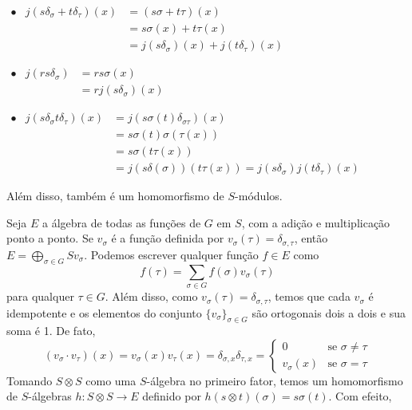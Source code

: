     \vspace{0.3 cm}
    
     $\begin{array}{rrl}
        \bullet &  j(s\delta_\sigma+t\delta_\tau)(x) &= (s\sigma+t\tau)(x) \\
       & &= s\sigma(x)+t\tau(x) \\
        & &= j(s\delta_\sigma)(x)+j(t\delta_\tau)(x)
    \end{array}$
    
     \vspace{0.3 cm}
     
     $\begin{array}{rrl}
       \bullet &  j(rs\delta_\sigma) &= rs\sigma(x) \\
        & &= rj(s\delta_\sigma)(x)
    \end{array}$
    
     \vspace{0.3 cm} 
     
     $\begin{array}{rrl}
        \bullet &  j(s\delta_\sigma t\delta_\tau)(x) &= j(s\sigma(t)\delta_{\sigma\tau})(x) \\
        & &= s\sigma(t)\sigma(\tau(x)) \\
        & &= s\sigma(t\tau(x)) \\
        & &= j(s\delta(\sigma))(t\tau(x))=j(s\delta_\sigma)j(t\delta_\tau)(x)
     \end{array}$
  \vspace{0.3 cm}
  
Além disso, também é um homomorfismo de $S$-módulos. \par 
Seja $E$ \label{alg:E} a álgebra de todas as funções de $G$ em $S$, com a adição e multiplicação ponto a ponto. Se $v_\sigma$ é a função definida por $v_\sigma(\tau)=\delta_{\sigma,\tau}$, então $E= \bigoplus_{\sigma \in G}Sv_\sigma$.
Podemos escrever qualquer função $f\in E$ como\[f(\tau)=\sum_{\sigma \in G} f(\sigma)v_\sigma(\tau)\]para qualquer $\tau \in G$. Além disso, como $v_\sigma(\tau) = \delta_{\sigma,\tau}$, temos que cada $v_\sigma$ é idempotente e os elementos do conjunto $\{v_\sigma\}_{\sigma \in G}$ são ortogonais dois a dois e sua soma é 1. De fato,\[(v_\sigma \cdot v_\tau )(x) =v_\sigma(x)v_\tau(x)=\delta_{\sigma,x}\delta_{\tau,x}=\begin{cases}
0 & \textrm{se } \sigma\neq \tau \\
v_\sigma(x) & \textrm{se } \sigma=\tau \end{cases}\]
Tomando $S\otimes S$ como uma $S$-álgebra no primeiro fator, temos um homomorfismo de $S$-álgebras $h: S\otimes S \rightarrow E$ definido por $h(s\otimes t)(\sigma)=s\sigma(t)$. Com efeito,

